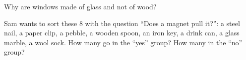 \begin{exercise}[$\star\star$]\label{exo:g1:materials-around-us:10}
Why are windows made of glass and not of wood?
\end{exercise}

\begin{exercise}[$\star\star$]\label{exo:g1:materials-around-us:11}
Sam wants to sort these 8  with the question ``Does a magnet pull
it?'': a steel nail, a paper clip, a pebble, a wooden spoon, an iron
key, a drink can, a glass marble, a wool sock. How many  go in the
``yes'' group? How many in the ``no'' group?
\end{exercise}
